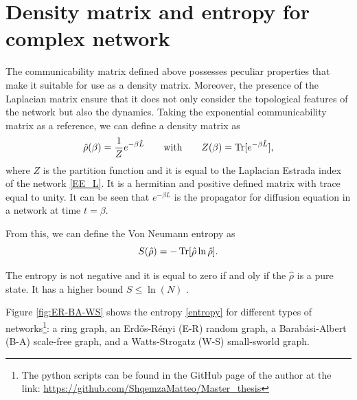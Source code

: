 \section{Density matrix and entropy for complex network}
The communicability matrix defined above possesses peculiar properties that make it suitable for use as a density matrix. Moreover, the presence of the Laplacian matrix ensure that it does not only consider the topological features of the network but also the dynamics. Taking the exponential communicability matrix as a reference, we can define a density matrix as
\begin{equation}\label{density_matrix}
    \hat \rho(\beta) = \frac{1}{Z} e^{-\beta \hat L} \qquad \mathrm{with} \qquad Z(\beta) = \operatorname{Tr}[e^{-\beta \hat L}],
\end{equation}
where $Z$ is the partition function and it is equal to the Laplacian Estrada index of the network \eqref{EE_L}.
It is a hermitian and positive defined matrix with trace equal to unity. 
It can be seen that $e^{-\beta L}$ is the propagator for diffusion equation in a network at time $t = \beta$.

From this, we can define the Von Neumann entropy as
\begin{equation} \label{entropy}
    S(\hat\rho) = -\operatorname{Tr}[\hat \rho \ln \hat \rho].
\end{equation}


The entropy is not negative and it is equal to zero if and oly if the $\hat\rho$ is a pure state. It has a higher bound $S \leq \ln(N)$ \cite{Nielsen_Chuang_2010}.


Figure \ref{fig:ER-BA-WS} shows the entropy \eqref{entropy} for different types of networks\footnote{The python scripts can be found in the GitHub page of the author at the link: \url{https://github.com/ShqemzaMatteo/Master_thesis}}: a ring graph, an Erd\H{o}s-Rényi (E-R) random graph, a Barab\'asi-Albert (B-A) scale-free graph, and a Watts-Strogatz (W-S) small-sworld graph.

